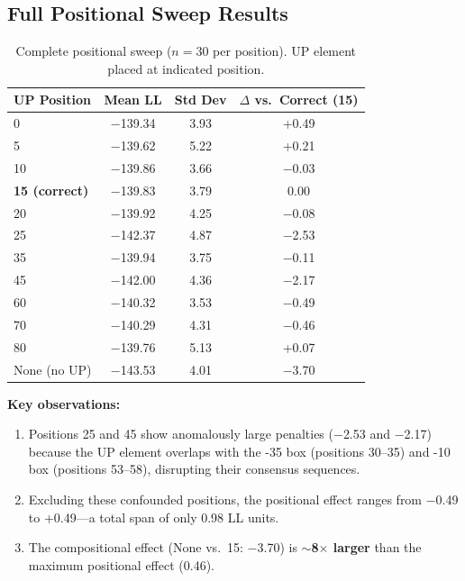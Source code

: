 \documentclass{article}
\begin{document}
\subsection{Full Positional Sweep Results}

\begin{table}[H]
\caption{Complete positional sweep ($n=30$ per position). UP element placed at indicated position.}
\label{tab:full_positional}
\begin{center}
\small
\begin{tabular}{lccc}
\toprule
UP Position & Mean LL & Std Dev & $\Delta$ vs.\ Correct (15) \\
\midrule
0 & $-$139.34 & 3.93 & +0.49 \\
5 & $-$139.62 & 5.22 & +0.21 \\
10 & $-$139.86 & 3.66 & $-$0.03 \\
\textbf{15 (correct)} & $-$139.83 & 3.79 & 0.00 \\
20 & $-$139.92 & 4.25 & $-$0.08 \\
25 & $-$142.37 & 4.87 & $-$2.53 \\
35 & $-$139.94 & 3.75 & $-$0.11 \\
45 & $-$142.00 & 4.36 & $-$2.17 \\
60 & $-$140.32 & 3.53 & $-$0.49 \\
70 & $-$140.29 & 4.31 & $-$0.46 \\
80 & $-$139.76 & 5.13 & +0.07 \\
\midrule
None (no UP) & $-$143.53 & 4.01 & $-$3.70 \\
\bottomrule
\end{tabular}
\end{center}
\end{table}

\textbf{Key observations:}
\begin{enumerate}
\item Positions 25 and 45 show anomalously large penalties ($-$2.53 and $-$2.17) because the UP element overlaps with the -35 box (positions 30--35) and -10 box (positions 53--58), disrupting their consensus sequences.
\item Excluding these confounded positions, the positional effect ranges from $-$0.49 to +0.49---a total span of only 0.98 LL units.
\item The compositional effect (None vs.\ 15: $-$3.70) is \textbf{$\sim$8$\times$ larger} than the maximum positional effect (0.46).
\end{enumerate}
\end{document}
